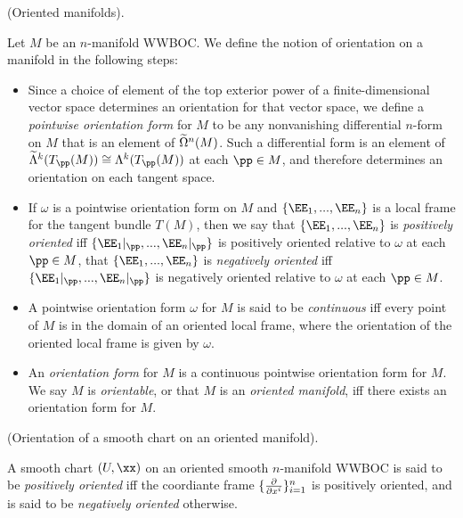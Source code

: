 \begin{defn}
     (Oriented manifolds).
    
    Let $M$ be an $n$-manifold WWBOC. We define the notion of orientation on a manifold in the following steps:
    
    \begin{itemize}
        \item Since a choice of element of the top exterior power of a finite-dimensional vector space determines an orientation for that vector space, we define a \textit{pointwise orientation form} for $M$ to be any nonvanishing differential $n$-form on $M$ that is an element of $\widetilde{\Omega}^n(M)$. Such a differential form is an element of $\tLambda^k(T_\pp(M)) \cong \Lambda^k(T_\pp(M))$ at each $\pp \in M$, and therefore determines an orientation on each tangent space.
        \item If $\omega$ is a pointwise orientation form on $M$ and $\{\EE_1, ..., \EE_n\}$ is a local frame for the tangent bundle $T(M)$, then we say that $\{\EE_1, ..., \EE_n\}$ is \textit{positively oriented} iff $\{\EE_1|_\pp, ..., \EE_n|_\pp\}$ is positively oriented relative to $\omega$ at each $\pp \in M$, that $\{\EE_1, ..., \EE_n\}$ is \textit{negatively oriented} iff $\{\EE_1|_\pp, ..., \EE_n|_\pp\}$ is negatively oriented relative to $\omega$ at each $\pp \in M$.
        \item A pointwise orientation form $\omega$ for $M$ is said to be \textit{continuous} iff every point of $M$ is in the domain of an oriented local frame, where the orientation of the oriented local frame is given by $\omega$.
        \item An \textit{orientation form} for $M$ is a continuous pointwise orientation form for $M$. We say $M$ is \textit{orientable}, or that $M$ is an \textit{oriented manifold}, iff there exists an orientation form for $M$.
    \end{itemize}
\end{defn}

\begin{defn}
\label{ch::manifolds::defn::orientation_smooth_chart}
     (Orientation of a smooth chart on an oriented manifold).
    
    A smooth chart $(U, \xx)$ on an oriented smooth $n$-manifold WWBOC is said to be \textit{positively oriented} iff the coordiante frame $\{\frac{\partial}{\partial x^i}\}_{i = 1}^n$ is positively oriented, and is said to be \textit{negatively oriented} otherwise.
\end{defn}

